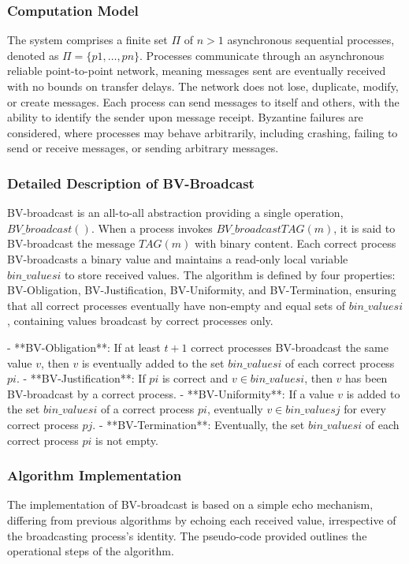 \documentclass[a4paper,11pt,oneside]{report}
\begin{document}
\subsubsection{Computation Model}
The system comprises a finite set \( \Pi \) of \( n > 1 \) asynchronous sequential processes, denoted as \( \Pi = \{p1, \ldots, pn\} \). Processes communicate through an asynchronous reliable point-to-point network, meaning messages sent are eventually received with no bounds on transfer delays. The network does not lose, duplicate, modify, or create messages. Each process can send messages to itself and others, with the ability to identify the sender upon message receipt. Byzantine failures are considered, where processes may behave arbitrarily, including crashing, failing to send or receive messages, or sending arbitrary messages.

\subsubsection{Detailed Description of BV-Broadcast}
BV-broadcast is an all-to-all abstraction providing a single operation, \( BV\_broadcast() \). When a process invokes \( BV\_broadcast TAG(m) \), it is said to BV-broadcast the message \( TAG(m) \) with binary content. Each correct process BV-broadcasts a binary value and maintains a read-only local variable \( bin\_valuesi \) to store received values. The algorithm is defined by four properties: BV-Obligation, BV-Justification, BV-Uniformity, and BV-Termination, ensuring that all correct processes eventually have non-empty and equal sets of \( bin\_valuesi \), containing values broadcast by correct processes only.

- **BV-Obligation**: If at least \( t+1 \) correct processes BV-broadcast the same value \( v \), then \( v \) is eventually added to the set \( bin\_valuesi \) of each correct process \( pi \).
- **BV-Justification**: If \( pi \) is correct and \( v \in bin\_valuesi \), then \( v \) has been BV-broadcast by a correct process.
- **BV-Uniformity**: If a value \( v \) is added to the set \( bin\_valuesi \) of a correct process \( pi \), eventually \( v \in bin\_valuesj \) for every correct process \( pj \).
- **BV-Termination**: Eventually, the set \( bin\_valuesi \) of each correct process \( pi \) is not empty.

\subsubsection{Algorithm Implementation}
The implementation of BV-broadcast is based on a simple echo mechanism, differing from previous algorithms by echoing each received value, irrespective of the broadcasting process's identity. The pseudo-code provided outlines the operational steps of the algorithm. 
\end{document}
